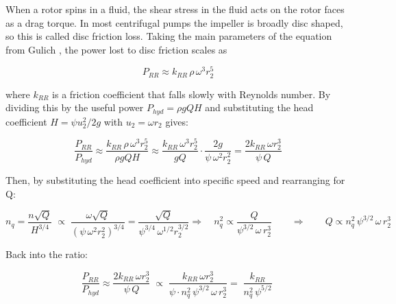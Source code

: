 When a rotor spins in a fluid, the shear stress in the fluid acts on the rotor faces as a drag torque. In most centrifugal pumps the impeller is broadly disc shaped, so this is called disc friction loss. Taking the main parameters of the equation from Gulich \cite{gulichCentrifugalPumps2020}, the power lost to disc friction scales as

\begin{equation}
    P_{RR} \approx k_{RR}\, \rho\, \omega^3 r_2^5
    \label{eq:disc_friction_scaling} %
\end{equation}

where $k_{RR}$ is a friction coefficient that falls slowly with Reynolds number. By dividing this by the useful power $P_{hyd}=\rho g Q H$ and substituting the head coefficient $H=\psi u_2^2/2g$ with $u_2=\omega r_2$ gives:


\begin{equation}
    \frac{P_{RR}}{P_{hyd}} \approx \frac{k_{RR}\,\rho\,\omega^3 r_2^5}{\rho g Q H} \approx \frac{k_{RR}\,\omega^3 r_2^5}{g Q}\cdot\frac{2g}{\psi\,\omega^2 r_2^2} = \frac{2 k_{RR}\,\omega r_2^3}{\psi\, Q}
    \label{eq:disc_loss_fraction}
\end{equation}

Then, by substituting the head coefficient into specific speed and rearranging for Q:

\begin{equation}
    n_q = \frac{n\sqrt{Q}}{H^{3/4}} 
\;\propto\; \frac{\omega\sqrt{Q}}{\left(\psi\,\omega^2 r_2^2\right)^{3/4}}
= \frac{\sqrt{Q}}{\psi^{3/4}\,\omega^{1/2} r_2^{3/2}}
\Rightarrow\quad n_q^2 \propto \frac{Q}{\psi^{3/2}\,\omega\, r_2^3}
\qquad\Longrightarrow\qquad 
Q \propto n_q^2\,\psi^{3/2}\,\omega\, r_2^3 
\end{equation}

Back into the ratio:

\begin{equation}
\frac{P_{RR}}{P_{hyd}}
\approx \frac{2 k_{RR}\,\omega r_2^3}{\psi\, Q}
\;\propto\; \frac{k_{RR}\,\omega r_2^3}{\psi \cdot n_q^2\,\psi^{3/2}\,\omega\, r_2^3}
= \boxed{\;\frac{k_{RR}}{n_q^{2}\,\psi^{5/2}}\;}
\label{eq:disc_loss_specific_speed}
\end{equation}

